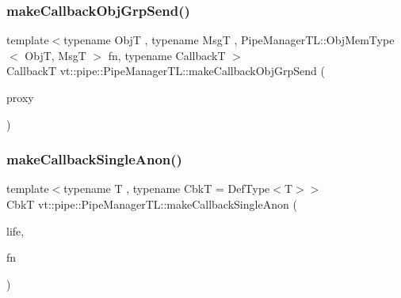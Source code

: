 \mbox{\label{structvt_1_1pipe_1_1_pipe_manager_t_l_a304681fe59bec2e1ad28a357f48aeab3}} 
\subsubsection{\texorpdfstring{make\+Callback\+Obj\+Grp\+Send()}{makeCallbackObjGrpSend()}\hspace{0.1cm}{\footnotesize\ttfamily [2/2]}}
{\footnotesize\ttfamily template$<$typename ObjT , typename MsgT , Pipe\+Manager\+T\+L\+::\+Obj\+Mem\+Type$<$ Obj\+T, Msg\+T $>$ fn, typename CallbackT $>$ \\
CallbackT vt\+::pipe\+::\+Pipe\+Manager\+T\+L\+::make\+Callback\+Obj\+Grp\+Send (\begin{DoxyParamCaption}\item[{\hyperlink{structvt_1_1objgroup_1_1proxy_1_1_proxy_elm}{objgroup\+::proxy\+::\+Proxy\+Elm}$<$ ObjT $>$}]{proxy }\end{DoxyParamCaption})}

\mbox{\label{structvt_1_1pipe_1_1_pipe_manager_t_l_ad3ee09b4e7976de176b14d76d70b2bdb}} 
\subsubsection{\texorpdfstring{make\+Callback\+Single\+Anon()}{makeCallbackSingleAnon()}\hspace{0.1cm}{\footnotesize\ttfamily [1/6]}}
{\footnotesize\ttfamily template$<$typename T , typename CbkT  = Def\+Type$<$\+T$>$$>$ \\
CbkT vt\+::pipe\+::\+Pipe\+Manager\+T\+L\+::make\+Callback\+Single\+Anon (\begin{DoxyParamCaption}\item[{\hyperlink{namespacevt_1_1pipe_acb42b284378c0fdac1d7c6335dc26f58}{Lifetime\+Enum}}]{life,  }\item[{\hyperlink{structvt_1_1pipe_1_1_pipe_manager_base_aa54eee64ab32a27777a672d49eb861f4}{Func\+Msg\+Type}$<$ T $>$}]{fn }\end{DoxyParamCaption})}

